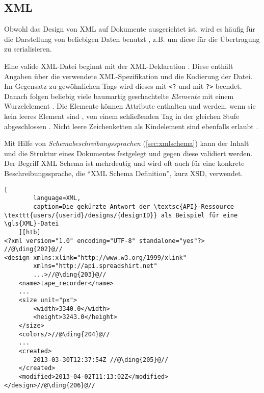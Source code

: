 \subsection{XML}
\label{sec:xml}


Obwohl das Design von \gls{XML} auf Dokumente ausgerichtet ist, wird es häufig für die Darstellung von beliebigen Daten benutzt \cite{wiki:xml}, z.B. um diese für die Übertragung zu serialisieren.

Eine valide \gls{XML}-Datei beginnt mit der \gls{XML}-Deklaration . Diese enthält Angaben über die verwendete \gls{XML}-Spezifikation und die Kodierung der Datei. 
Im Gegensatz zu gewöhnlichen Tags wird dieses mit \texttt{<?} und mit \texttt{?>} beendet. 
Danach folgen beliebig viele baumartig geschachtelte \emph{Elemente} mit einem Wurzelelement . Die Elemente können Attribute enthalten und werden, wenn sie kein leeres Element sind , von einem schließenden Tag in der gleichen Stufe abgeschlossen . Nicht leere Zeichenketten als Kindelement sind ebenfalls erlaubt .

Mit Hilfe von \emph{Schemabeschreibungssprachen} (\cref{sec:xmlschema}) kann der Inhalt und die Struktur eines Dokumentes festgelegt und gegen diese validiert werden. Der Begriff \gls{XML} Schema ist mehrdeutig und wird oft auch für eine konkrete Beschreibungssprache, die \enquote{\gls{XML} Schema Definition}, kurz \gls{XSD}, verwendet.

\begin{minipage}{\textwidth}
\begin{lstlisting}[
        language=XML, 
        caption=Die gekürzte Antwort der \textsc{API}-Ressource \texttt{users/{userid}/designs/{designID}} als Beispiel für eine \gls{XML}-Datei
    ][htb]
<?xml version="1.0" encoding="UTF-8" standalone="yes"?> //@\ding{202}@//
<design xmlns:xlink="http://www.w3.org/1999/xlink" 
        xmlns="http://api.spreadshirt.net" 
        ...>//@\ding{203}@//
    <name>tape_recorder</name>
    ...
    <size unit="px">
        <width>3340.0</width>
        <height>3243.0</height>
    </size>
    <colors/>//@\ding{204}@//
    ...
    <created>
        2013-03-30T12:37:54Z //@\ding{205}@//
    </created>
    <modified>2013-04-02T11:13:02Z</modified>
</design>//@\ding{206}@//
\end{lstlisting}
\end{minipage}
